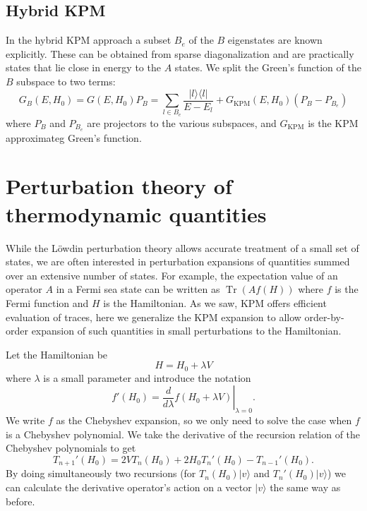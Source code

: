 \documentclass[10pt, onecolumn, aps, prb, superscriptaddress, floatfix, showpacs, notitlepage]{revtex4-1}
\newcommand{\ket}[1]{|#1\rangle}
\def\Tr{\ensuremath{\operatorname{Tr}}}
\begin{document}
\subsection{Hybrid KPM}

In the hybrid KPM approach a subset $B_e$ of the $B$ eigenstates are known explicitly.
These can be obtained from sparse diagonalization and are practically states that lie close in energy to the $A$ states.
We split the Green's function of the $B$ subspace to two terms:
\begin{equation}
G_B(E, H_0) = G(E, H_0) P_B = \sum_{l\in B_e} \frac{| l \rangle\langle l |}{E - E_l} + G_{\text{KPM}}(E, H_0) (P_B - P_{B_e})
\end{equation}
where $P_B$ and $P_{B_e}$ are projectors to the various subspaces, and $G_{\text{KPM}}$ is the KPM approximateg Green's function.


\section{Perturbation theory of thermodynamic quantities}

While the L{\"o}wdin perturbation theory allows accurate treatment of a small set of states, we are often interested in perturbation expansions of quantities summed over an extensive number of states.
For example, the expectation value of an operator $A$ in a Fermi sea state can be written as $\Tr \left(A f(H) \right)$ where $f$ is the Fermi function and $H$ is the Hamiltonian.
As we saw, KPM offers efficient evaluation of traces, here we generalize the KPM expansion to allow order-by-order expansion of such quantities in small perturbations to the Hamiltonian.

Let the Hamiltonian be
\begin{equation}
H = H_0 + \lambda V
\end{equation}
where $\lambda$ is a small parameter and introduce the notation
\begin{equation}
f'(H_0) = \left.\frac{d}{d\lambda} f (H_0 + \lambda V)\right|_{\lambda=0}.
\end{equation}
We write $f$ as the Chebyshev expansion, so we only need to solve the case when $f$ is a Chebyshev polynomial.
We take the derivative of the recursion relation of the Chebyshev polynomials to get
\begin{equation}
T_{n+1}'(H_0) = 2 V T_n(H_0) + 2 H_0 T_n'(H_0) - T_{n-1}'(H_0).
\end{equation}
By doing simultaneously two recursions (for $T_n(H_0) \ket{v}$ and $T_n'(H_0) \ket{v}$) we can calculate the derivative operator's action on a vector $\ket{v}$ the same way as before.
\end{document}
